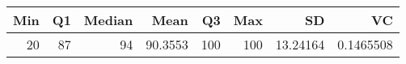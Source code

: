 
\begin{tabular}[t]{rrrrrrrr}
\toprule
Min & Q1 & Median & Mean & Q3 & Max & SD & VC\\
\midrule
20 & 87 & 94 & 90.3553 & 100 & 100 & 13.24164 & 0.1465508\\
\bottomrule
\end{tabular}